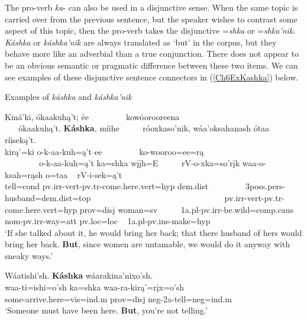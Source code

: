 The pro-verb \textit{ka}- can also be used in a disjunctive sense. When the same topic is carried over from the previous sentence, but the speaker wishes to contrast some aspect of this topic, then the pro-verb takes the disjunctive =\textit{shka} or =\textit{shka'nik}. \textit{Káshka} or \textit{káshka'nik} are always translated as `but' in the corpus, but they behave more like an adverbial than a true conjunction. There does not appear to be an obvious semantic or pragmatic difference between these two items. We can see examples of these disjunctive sentence connectors in (\ref{Ch6ExKashka}) below.

\begin{exe}
    \item\label{Ch6ExKashka} Examples of \textit{káshka} and \textit{káshka'nik}

    \begin{xlist}
        \item\label{Ch6ExKashkaA} \glll Kiná'ki, ókaakuhą't; ée ~ ~ ~ ~ ~ kowóorooreena ~ ~ ~ ~ ~ ~ ~ ~ ~ ~ ~ ~ ~ ~ ~ ~ ~ ~ ~ ókaakuhą't. \textbf{Káshka}, míihe ~ ~ ~ róoxkaso'nik, wáa'oksahanash ótaa ~ ríiseką't.\\
        kirą'=ki o-k-aa-kuh=ą't ee ~ ~ ~ ~ ~ ko-wooroo=ee=rą ~ ~ ~ ~ ~ ~ ~ ~ ~ ~ ~ ~ ~ ~ ~ ~ ~ ~ ~ o-k-aa-kuh=ą't ka=shka wįįh=E ~ ~ ~ rV-o-xka=so'rįk waa-o-ksah=rąsh o=taa ~ rV-i-sek=ą't\\
        \textnormal{tell}=cond pv.irr-vert-pv.tr-\textnormal{come.here}.vert=hyp dem.dist ~ ~ ~ ~ ~ 3poss.pers-\textnormal{husband}=dem.dist=top ~ ~ ~ ~ ~ ~ ~ ~ ~ ~ ~ ~ ~ ~ ~ ~ ~ ~ ~ pv.irr-vert-pv.tr-\textnormal{come.here}.vert=hyp prov=disj \textnormal{woman}=sv ~ ~ ~ 1a.pl-pv.irr-\textnormal{be.wild}=comp.caus nom-pv.irr-\textnormal{way}=att pv.loc=loc ~ 1a.pl-pv.ins-\textnormal{make}=hyp\\
        \glt `If she talked about it, he would bring her back; that there husband of hers would bring her back. \textbf{But}, since women are untamable, we would do it anyway with sneaky ways.' \citep[80]{hollow1973a}

        \item\label{Ch6ExKashkaB} \glll Wáatishi'sh. \textbf{Káshka} wáarakina'nixo'sh.\\
        waa-ti=ishi=o'sh ka=shka waa-ra-kirą'=rįx=o'sh\\
        \textnormal{some}-\textnormal{arrive.here}=vis=ind.m prov=disj neg-2a-\textnormal{tell}=neg=ind.m\\
        \glt `Someone must have been here. \textbf{But}, you're not telling.' \citep[162]{hollow1973a}


\end{xlist}
\end{exe}
